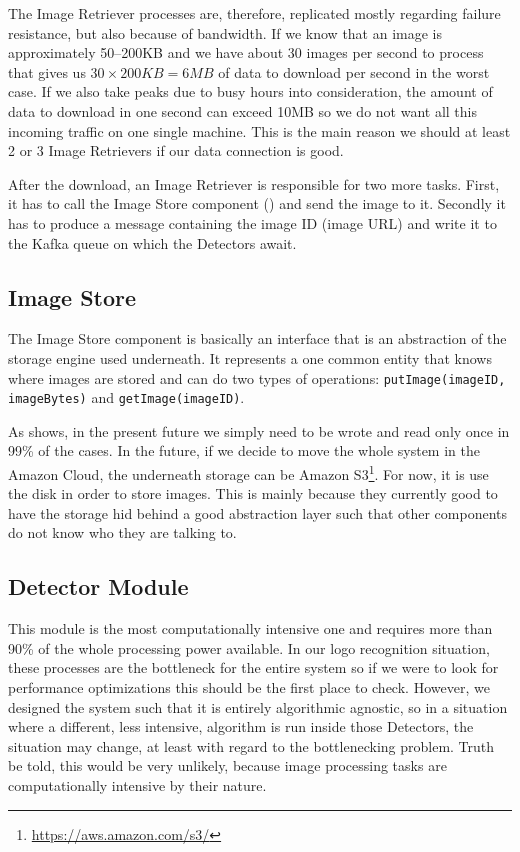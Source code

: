 The Image Retriever processes are, therefore, replicated mostly regarding
failure resistance, but also because of bandwidth. If we know that an image is
approximately 50--200KB and we have about 30 images per second to process that
gives us \(30 \times 200KB = 6MB\) of data to download per second in the worst
case. If we also take peaks due to busy hours into consideration, the amount
of data to download in one second can exceed 10MB so we do not want all this
incoming traffic on one single machine. This is the main reason we should at
least 2 or 3 Image Retrievers if our data connection is good.

After the download, an Image Retriever is responsible for two more tasks.
First, it has to call the Image Store component
() and send the image to it.
Secondly it has to produce a message containing the image ID (image URL) and
write it to the Kafka queue on which the Detectors await.

\subsection{Image Store}
\label{sub-sec:im-store}

The Image Store component is basically an interface that is an abstraction of
the storage engine used underneath. It represents a one common entity that
knows where images are stored and can do two types of operations:
\texttt{putImage(imageID, imageBytes)} and \texttt{getImage(imageID)}.

As  shows, in the present future we simply
need to be wrote and read only once in 99\% of the cases. In the future, if we
decide to move the whole system in the Amazon Cloud, the underneath storage
can be Amazon S3\footnote{\url{https://aws.amazon.com/s3/}}. For now, it is
use the disk in order to store images. This is mainly because they currently
good to have the storage hid behind a good abstraction layer such that other
components do not know who they are talking to.

\subsection{Detector Module}

This module is the most computationally intensive one and requires more than
90\% of the whole processing power available. In our logo recognition
situation, these processes are the bottleneck for the entire system so if we
were to look for performance optimizations this should be the first place to
check. However, we designed the system such that it is entirely algorithmic
agnostic, so in a situation where a different, less intensive, algorithm is
run inside those Detectors, the situation may change, at least with regard to
the bottlenecking problem. Truth be told, this would be very unlikely, because
image processing tasks are computationally intensive by their nature.

